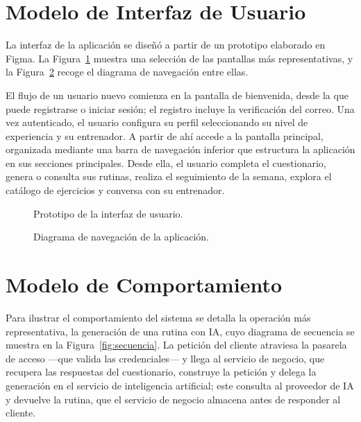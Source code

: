 \section{Modelo de Interfaz de Usuario}
La interfaz de la aplicación se diseñó a partir de un prototipo elaborado en Figma. La Figura~\ref{fig:mockup} muestra una selección de las pantallas más representativas, y la Figura~\ref{fig:navegacion} recoge el diagrama de navegación entre ellas.

El flujo de un usuario nuevo comienza en la pantalla de bienvenida, desde la que puede registrarse o iniciar sesión; el registro incluye la verificación del correo. Una vez autenticado, el usuario configura su perfil seleccionando su nivel de experiencia y su entrenador. A partir de ahí accede a la pantalla principal, organizada mediante una barra de navegación inferior que estructura la aplicación en sus secciones principales. Desde ella, el usuario completa el cuestionario, genera o consulta sus rutinas, realiza el seguimiento de la semana, explora el catálogo de ejercicios y conversa con su entrenador.

\begin{figure}[ht]
\centering
\caption{Prototipo de la interfaz de usuario.}
\label{fig:mockup}
\end{figure}

\begin{figure}[ht]
\centering
\caption{Diagrama de navegación de la aplicación.}
\label{fig:navegacion}
\end{figure}

\section{Modelo de Comportamiento}
Para ilustrar el comportamiento del sistema se detalla la operación más representativa, la generación de una rutina con IA, cuyo diagrama de secuencia se muestra en la Figura~\ref{fig:secuencia}. La petición del cliente atraviesa la pasarela de acceso ---que valida las credenciales--- y llega al servicio de negocio, que recupera las respuestas del cuestionario, construye la petición y delega la generación en el servicio de inteligencia artificial; este consulta al proveedor de IA y devuelve la rutina, que el servicio de negocio almacena antes de responder al cliente.

